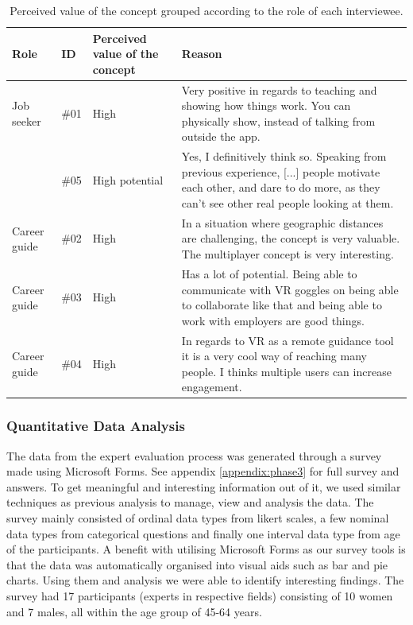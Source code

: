 \begin{table}[H]
      \centering
        \begin{tabular}{llp{2.5cm}p{5cm}}
        \toprule
        Role & ID & Perceived value of the concept & Reason\\
        \midrule\vspace{0.2cm}
         Job seeker  & \#01 & High & Very positive in regards to teaching and showing how things work. You can physically show, instead of talking from outside the app.\\
         & \#05  & High potential & Yes, I definitively think so. Speaking from previous experience, [...] people motivate each other, and dare to do more, as they can't see other real people looking at them.
         \\\midrule \vspace{0.2cm}
        Career guide & \#02  & High & In a situation where geographic distances are challenging, the concept is very valuable. The multiplayer concept is very interesting.\\ \vspace{0.2cm}
        Career guide & \#03  & High & Has a lot of potential. Being able to communicate with VR goggles on being able to collaborate like that and being able to work with employers are good things. \\ 
        Career guide & \#04  & High & In regards to VR as a remote guidance tool it is a very cool way of reaching many people. I thinks multiple users can increase engagement. \\
        \bottomrule
        \end{tabular}
        \caption{Perceived value of the concept grouped according to the role of each interviewee.}
        \label{table:phase3SatisfactionAnalysis}
\end{table}



\subsubsection{Quantitative Data Analysis}
The data from the expert evaluation process was generated through a survey made using Microsoft Forms. See appendix \ref{appendix:phase3} for full survey and answers. To get meaningful and interesting information out of it, we used similar techniques as previous analysis to manage, view and analysis the data. The survey mainly consisted of ordinal data types from likert scales, a few nominal data types from categorical questions and finally one interval data type from age of the participants.  
A benefit with utilising Microsoft Forms as our survey tools is that the data was automatically organised into visual aids such as bar and pie charts. Using them and analysis we were able to identify interesting findings. 
The survey had 17 participants (experts in respective fields) consisting of 10 women and 7 males, all within the age group  of 45-64 years. 


